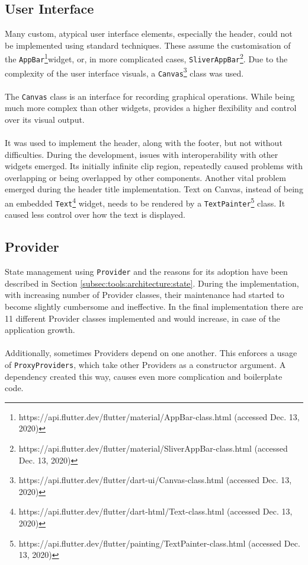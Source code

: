 \subsection{User Interface}
Many custom, atypical user interface elements, especially the header, could not be implemented using standard techniques. These assume the customisation of the \texttt{AppBar}\footnote{https://api.flutter.dev/flutter/material/AppBar-class.html (accessed Dec. 13, 2020)}widget, or, in more complicated cases, \texttt{SliverAppBar}\footnote{https://api.flutter.dev/flutter/material/SliverAppBar-class.html (accessed Dec. 13, 2020)}. Due to the complexity of the user interface visuals, a \texttt{Canvas}\footnote{https://api.flutter.dev/flutter/dart-ui/Canvas-class.html (accessed Dec. 13, 2020)} class was used.
\\\\
The \texttt{Canvas} class is an interface for recording graphical operations. While being much more complex than other widgets, provides a higher flexibility and control over its visual output. 
\\\\
It was used to implement the header, along with the footer, but not without difficulties. During the development, issues with interoperability with other widgets emerged. Its initially infinite clip region, repeatedly caused problems with overlapping or being overlapped by other components. Another vital problem emerged during the header title implementation. Text on Canvas, instead of being an embedded \texttt{Text}\footnote{https://api.flutter.dev/flutter/dart-html/Text-class.html (accessed Dec. 13, 2020)} widget, needs to be rendered by a \texttt{TextPainter}\footnote{https://api.flutter.dev/flutter/painting/TextPainter-class.html (accessed Dec. 13, 2020)} class. It caused less control over how the text is displayed.


\subsection{Provider}
State management using \texttt{Provider} and the reasons for its adoption have been described in Section \ref{subsec:tools:architecture:state}. During the implementation, with increasing number of Provider classes, their maintenance had started to become slightly cumbersome and ineffective. In the final implementation there are 11 different Provider classes implemented and would increase, in case of the application growth.
\\\\
Additionally, sometimes Providers depend on one another. This enforces a usage of \texttt{ProxyProviders}, which take other Providers as a constructor argument. A dependency created this way, causes even more complication and boilerplate code.

